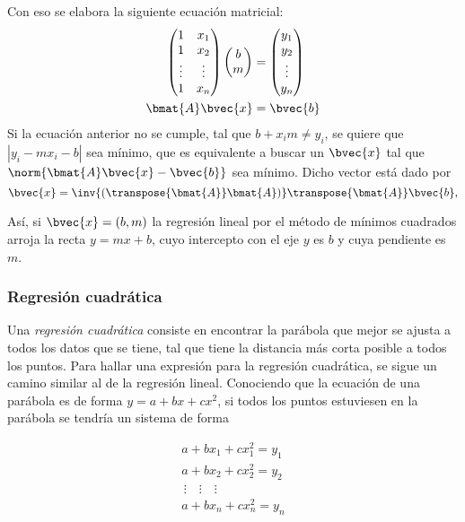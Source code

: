 \documentclass{fmbnotes}
\begin{document}
Con eso se elabora la siguiente ecuación matricial:
\begin{align*}
\begin{pmatrix}
	1 & x_1 \\ 1 & x_2\\ \vdots & \vdots \\1 & x_n
\end{pmatrix}\begin{pmatrix}
b\\m
\end{pmatrix}&=\begin{pmatrix}
y_1 \\y_2\\ \vdots \\y_n
\end{pmatrix}\\
\bmat{A}\bvec{x}&=\bvec{b}
\end{align*}
Si la ecuación anterior no se cumple, tal que \(b+x_im\neq y_i\), se quiere que \(\left|y_i-mx_i-b\right|\) sea mínimo, que es equivalente a buscar un \(\bvec{x}\) tal que \(\norm{\bmat{A}\bvec{x}-\bvec{b}}\) sea mínimo. Dicho vector está dado por
\begin{equation*}
 \bvec{x}=\inv{(\transpose{\bmat{A}}\bmat{A})}\transpose{\bmat{A}} \bvec{b},
\end{equation*}

Así, si \(\bvec{x}=(b,m)\) la regresión lineal por el método de mínimos cuadrados arroja la recta \(y=mx+b\), cuyo intercepto con el eje \(y\) es \(b\) y cuya pendiente es \(m\).

\subsubsection{Regresión cuadrática}

Una \emph{regresión cuadrática} consiste en encontrar la parábola que mejor se ajusta a todos los datos que se tiene, tal que tiene la distancia más corta posible a todos los puntos. Para hallar una expresión para la regresión cuadrática, se sigue un camino similar al de la regresión lineal. Conociendo que la ecuación de una parábola es de forma \(y=a+bx+cx^2\), si todos los puntos estuviesen en la parábola se tendría un sistema de forma

\begin{gather*}
a+bx_1+cx_1^2=y_1  \\
a+bx_2+cx_2^2=y_2  \\
\, \vdots \quad \vdots \quad \vdots \\
a+bx_n+cx_n^2=y_n
\end{gather*}
\end{document}
